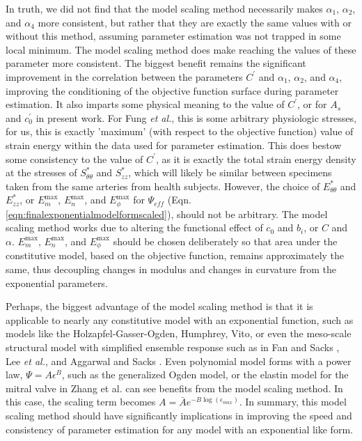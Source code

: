 	In truth, we did not find that the model scaling method necessarily makes $\alpha_1$, $\alpha_2$, and $\alpha_4$ more consistent, but rather that they are exactly the same values with or without this method, assuming parameter estimation was not trapped in some local minimum. The model scaling method does make reaching the values of these parameter more consistent. The biggest benefit remains the significant improvement in the correlation between the parameters $C^\prime$ and $\alpha_1$, $\alpha_2$, and $\alpha_4$, improving the conditioning of the objective function surface during parameter estimation. It also imparts some physical meaning to the value of $C^\prime$, or for $A_s$ and $c_0^\prime$ in present work. For Fung \textit{et al.}, this is some arbitrary physiologic stresses, for us, this is exactly 'maximum' (with respect to the objective function) value of strain energy within the data used for parameter estimation. This does bestow some consistency to the value of $C^\prime$, as it is exactly the total strain energy density at the stresses of $S_{\theta\theta}^*$ and $S_{zz}^*$, which will likely be similar between specimens taken from the same arteries from health subjects. However, the choice of $E_{\theta\theta}^*$ and $E_{zz}^*$, or $E_m^\mathrm{max}$, $E_n^\mathrm{max}$, and $E_\phi^\mathrm{max}$ for $\Psi_{eff}$ (Eqn. \ref{eqn:finalexponentialmodelformscaled}), should not be arbitrary. The model scaling method works due to altering the functional effect of $c_0$ and $b_i$, or $C$ and $\alpha$. $E_m^\mathrm{max}$, $E_n^\mathrm{max}$, and $E_\phi^\mathrm{max}$ should be chosen deliberately so that area under the constitutive model, based on the objective function, remains approximately the same, thus decoupling changes in modulus and changes in curvature from the exponential parameters. 


	Perhaps, the biggest advantage of the model scaling method is that it is applicable to nearly any constitutive model with an exponential function, such as models like the Holzapfel-Gasser-Ogden, Humphrey, Vito, or even the meso-scale structural model with simplified ensemble response such as in Fan and Sacks \cite{fan_simulation_2014a}, Lee \textit{et al.}\cite{lee_effects_2015}, and Aggarwal and Sacks \cite{aggarwal_inverse_2015}. Even polynomial model forms with a power law, $\Psi=A\epsilon^B$, such as the generalized Ogden model, or the elastin model for the mitral valve in Zhang et al. \cite{zhang_meso_2016} can see benefits from the model scaling method. In this case, the scaling term becomes $A = \bar{A} e^{-B \log(\epsilon_{max})}$. In summary, this model scaling method should have significantly implications in improving the speed and consistency of parameter estimation for any model with an exponential like form.
    
